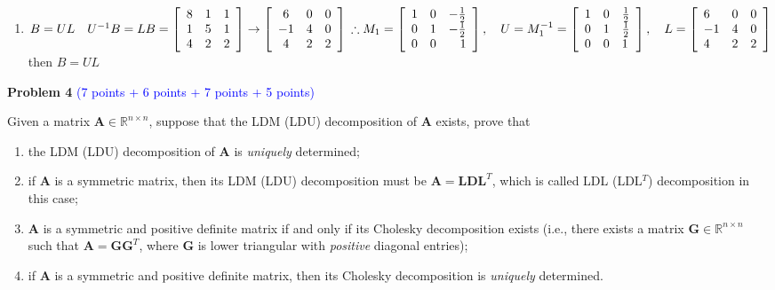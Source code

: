 \documentclass[english,onecolumn]{IEEEtran}
\begin{document}
\begin{enumerate}
    \item $B=UL \quad U^{-1}B=L \\ \\
B=\left[\begin{array}{ccc}
8 & 1 & 1 \\
1 & 5 & 1 \\
4 & 2 & 2
\end{array}\right] \rightarrow\left[\begin{array}{ccc}
6 & 0 & 0 \\
-1 & 4 & 0 \\
4 & 2 & 2
\end{array}\right] \\
\therefore M_{1}=\left[\begin{array}{rrr}
1 & 0 & -\frac{1}{2} \\
0 & 1 & -\frac{1}{2} \\
0 & 0 & 1
\end{array}\right], \quad U=M_{1}^{-1}=\left[\begin{array}{lll}
1 & 0 & \frac{1}{2} \\
0 & 1 & \frac{1}{2} \\
0 & 0 & 1
\end{array}\right], \quad L=\left[\begin{array}{lll}
6 & 0 & 0 \\
-1 & 4 & 0 \\
4 & 2 & 2
\end{array}\right]
$ then $B=UL$

\end{enumerate}

\newpage
\noindent\textbf{Problem 4} \textcolor{blue}{(7 points + 6 points + 7 points + 5 points)}

\noindent Given a matrix $\mathbf{A}\in\mathbb{R}^{n\times n}$, suppose that the LDM (LDU) decomposition of $\mathbf{A}$ exists, prove that
\begin{enumerate}
	\item the LDM (LDU) decomposition of $\mathbf{A}$ is \textit{uniquely} determined;
	\item if $\mathbf{A}$ is a symmetric matrix, then its LDM (LDU) decomposition must be $\mathbf{A}=\mathbf{L}\mathbf{D}\mathbf{L}^T$, which is called LDL (LDL$^T$) decomposition in this case;
	\item $\mathbf{A}$ is a symmetric and positive definite matrix if and only if its Cholesky decomposition exists (i.e., there exists a matrix $\mathbf{G}\in\mathbb{R}^{n\times n}$ such that $\mathbf{A}=\mathbf{G}\mathbf{G}^T$, where $\mathbf{G}$ is lower triangular with \textit{positive} diagonal entries);
	\item if $\mathbf{A}$ is a symmetric and positive definite matrix, then its Cholesky decomposition is \textit{uniquely} determined.	
\end{enumerate}
\end{document}
